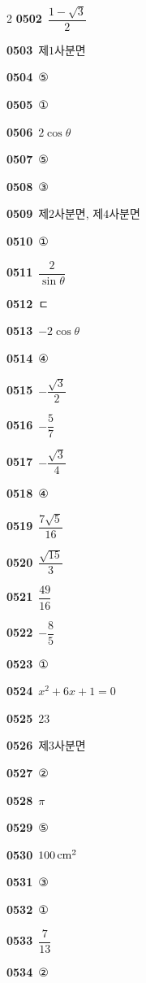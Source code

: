 \documentclass[10pt,a4paper]{article}
\begin{document}
\begin{multicols}{2}
\noindent\textbf{0502}\ $\dfrac{1-\sqrt{3}}{2}$\par
\noindent\textbf{0503}\ 제$1$사분면\par
\noindent\textbf{0504}\ ⑤\par
\noindent\textbf{0505}\ ①\par
\noindent\textbf{0506}\ $2\cos\theta$\par
\noindent\textbf{0507}\ ⑤\par
\noindent\textbf{0508}\ ③\par
\noindent\textbf{0509}\ 제$2$사분면, 제$4$사분면\par
\noindent\textbf{0510}\ ①\par
\noindent\textbf{0511}\ $\dfrac{2}{\sin\theta}$\par
\noindent\textbf{0512}\ ㄷ\par
\noindent\textbf{0513}\ $-2\cos\theta$\par
\noindent\textbf{0514}\ ④\par
\noindent\textbf{0515}\ $-\dfrac{\sqrt{3}}{2}$\par
\noindent\textbf{0516}\ $-\dfrac{5}{7}$\par
\noindent\textbf{0517}\ $-\dfrac{\sqrt{3}}{4}$\par
\noindent\textbf{0518}\ ④\par
\noindent\textbf{0519}\ $\dfrac{7\sqrt{5}}{16}$\par
\noindent\textbf{0520}\ $\dfrac{\sqrt{15}}{3}$\par
\noindent\textbf{0521}\ $\dfrac{49}{16}$\par
\noindent\textbf{0522}\ $-\dfrac{8}{5}$\par
\noindent\textbf{0523}\ ①\par
\noindent\textbf{0524}\ $x^2+6x+1=0$\par
\noindent\textbf{0525}\ $23$\par
\noindent\textbf{0526}\ 제$3$사분면\par
\noindent\textbf{0527}\ ②\par
\noindent\textbf{0528}\ $\pi$\par
\noindent\textbf{0529}\ ⑤\par
\noindent\textbf{0530}\ $100\mkern3mu \mathrm{cm}^2$\par
\noindent\textbf{0531}\ ③\par
\noindent\textbf{0532}\ ①\par
\noindent\textbf{0533}\ $\dfrac{7}{13}$\par
\noindent\textbf{0534}\ ②\par

\end{multicols}
\end{document}

